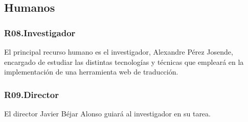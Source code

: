 \subsection{Humanos}
\subsubsection{R08.\quad Investigador}\label{R08}
El principal recurso humano es el investigador, Alexandre Pérez Josende,
encargado de estudiar las distintas tecnologías y técnicas que empleará en la
implementación de una herramienta web de traducción.

\subsubsection{R09.\quad Director}\label{R09}
El director Javier Béjar Alonso guiará al investigador en su tarea.

